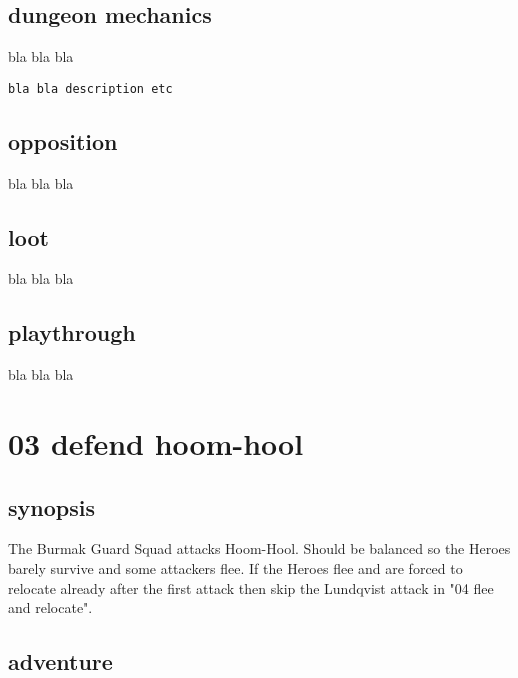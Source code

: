 \subsection*{dungeon mechanics}

bla bla bla

\small \begin{verbatim}
bla bla description etc
\end{verbatim} \normalsize


\subsection*{opposition}

bla bla bla


\subsection*{loot}

bla bla bla


\subsection*{playthrough}

bla bla bla







\newpage
\section*{03 defend hoom-hool}



\subsection*{synopsis}

The Burmak Guard Squad attacks Hoom-Hool. Should be balanced so the Heroes barely survive and some attackers flee. If the Heroes flee and are forced to relocate already after the first attack then skip the Lundqvist attack in "04 flee and relocate".


\subsection*{adventure}


